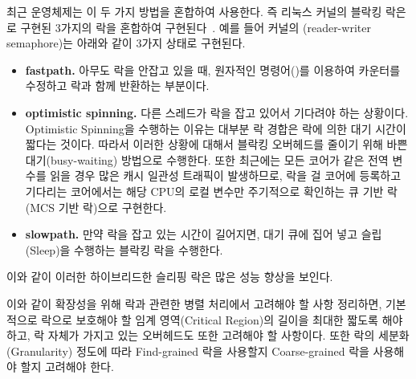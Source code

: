 최근 운영체제는 이 두 가지 방법을 혼합하여 사용한다. 
즉 리눅스 커널의 블락킹 락은 로 구현된 3가지의
락을 혼합하여 구현된다~\cite{Bueso2014STP}.
예를 들어 커널의 (reader-writer semaphore)는 아래와 같이 3가지 상태로 구현된다.
\begin{itemize}
\item \textbf{fastpath.} 아무도 락을 안잡고 있을 때, 원자적인 명령어()를 이용하여
카운터를 수정하고 락과 함께 반환하는 부분이다.
\item \textbf{optimistic spinning.} 다른 스레드가 락을 잡고 있어서 기다려야 하는 상황이다.
Optimistic Spinning을 수행하는 이유는 대부분 락 경합은 락에 의한 대기 시간이 짧다는 것이다.
따라서 이러한 상황에 대해서 블락킹 오버헤드를 줄이기 위해 바쁜대기(busy-waiting) 방법으로 수행한다. 
또한 최근에는 모든 코어가 같은 전역 변수를 읽을 경우 많은 캐시 일관성 트래픽이 발생하므로, 
락을 걸 코어에 등록하고 기다리는 코어에서는 해당 CPU의 로컬 변수만 주기적으로 확인하는 
큐 기반 락(MCS 기반 락)으로 구현한다. 
\item \textbf{slowpath.} 만약 락을 잡고 있는 시간이 길어지면, 대기 큐에 집어 넣고 슬립(Sleep)을 수행하는 블락킹 
락을 수행한다. 
\end{itemize}
이와 같이 이러한 하이브리드한 슬리핑 락은 많은 성능 향상을 보인다. 







이와 같이 확장성을 위해 락과 관련한 병렬 처리에서 고려해야 할 사항 정리하면,
기본적으로 락으로 보호해야 할 임계 영역(Critical Region)의 길이을 최대한 짧도록 해야 하고, 
락 자체가 가지고 있는 오버헤드도 또한 고려해야 할 사항이다. 
또한 락의 세분화(Granularity) 정도에 따라 Find-grained 락을 사용할지 Coarse-grained 락을 사용해야 할지 
고려해야 한다.

